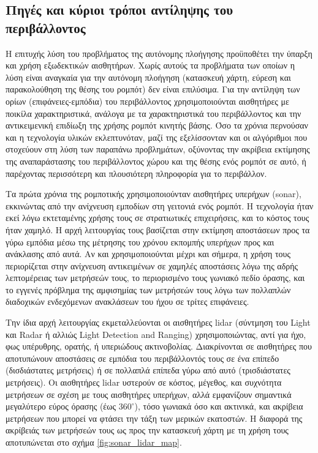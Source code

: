 \subsection{Πηγές και κύριοι τρόποι αντίληψης του περιβάλλοντος}
\label{subsec:01_01_01_2}

Η επιτυχής λύση του προβλήματος της αυτόνομης πλοήγησης προϋποθέτει την ύπαρξη
και χρήση εξωδεκτικών αισθητήρων. Χωρίς αυτούς τα προβλήματα των οποίων η λύση
είναι αναγκαία για την αυτόνομη πλοήγηση (κατασκευή χάρτη, εύρεση και
παρακολούθηση της θέσης του ρομπότ) δεν είναι επιλύσιμα. Για την αντίληψη των
ορίων (επιφάνειες-εμπόδια) του περιβάλλοντος χρησιμοποιούνται αισθητήρες με
ποικίλα χαρακτηριστικά, ανάλογα με τα χαρακτηριστικά του περιβάλλοντος και
την αντικειμενική επιδίωξη της χρήσης ρομπότ κινητής βάσης. Όσο τα χρόνια
περνούσαν και η τεχνολογία υλικών εκλεπτυνόταν, μαζί της εξελίσσονταν και
οι αλγόριθμοι που στοχεύουν στη λύση των παραπάνω προβλημάτων, οξύνοντας την
ακρίβεια εκτίμησης της αναπαράστασης του περιβάλλοντος χώρου και της θέσης ενός
ρομπότ σε αυτό, ή παρέχοντας περισσότερη και πλουσιότερη πληροφορία για το
περιβάλλον.

Τα πρώτα χρόνια της ρομποτικής χρησιμοποιούνταν αισθητήρες υπερήχων (sonar),
εκκινώντας από την ανίχνευση εμποδίων στη γειτονιά ενός ρομπότ. Η τεχνολογία
ήταν εκεί λόγω εκτεταμένης χρήσης τους σε στρατιωτικές επιχειρήσεις, και το
κόστος τους ήταν χαμηλό. Η αρχή λειτουργίας τους βασίζεται στην εκτίμηση
αποστάσεων προς τα γύρω εμπόδια μέσω της μέτρησης του χρόνου εκπομπής υπερήχων
προς και ανάκλασης από αυτά. Αν και χρησιμοποιούνται μέχρι και σήμερα, η χρήση
τους περιορίζεται στην ανίχνευση αντικειμένων σε χαμηλές αποστάσεις λόγω της
αδρής λεπτομέρειας των μετρήσεών τους, το περιορισμένο τους γωνιακό πεδίο
όρασης, και το εγγενές πρόβλημα της αμφισημίας των μετρήσεών τους λόγω των
πολλαπλών διαδοχικών ενδεχόμενων ανακλάσεων του ήχου σε τρίτες επιφάνειες.

Την ίδια αρχή λειτουργίας εκμεταλλεύονται οι αισθητήρες lidar (σύντμηση του
Light και Radar ή αλλιώς Light Detection and Ranging) χρησιμοποιώντας, αντί για
ήχο, φως υπέρυθρης, ορατής, ή υπεριώδους ακτινοβολίας. Διακρίνονται σε
αισθητήρες που αποτυπώνουν αποστάσεις σε εμπόδια του περιβάλλοντός τους σε ένα
επίπεδο (δισδιάστατες μετρήσεις) ή σε πολλαπλά επίπεδα γύρω από αυτό
(τρισδιάστατες μετρήσεις). Οι αισθητήρες lidar υστερούν σε κόστος, μέγεθος, και
συχνότητα μετρήσεων σε σχέση με τους αισθητήρες υπερήχων, αλλά εμφανίζουν
σημαντικά μεγαλύτερο εύρος όρασης (έως $360^\circ$), τόσο γωνιακά όσο και
ακτινικά, και ακρίβεια μετρήσεων που μπορεί να φτάσει την τάξη των μερικών
εκατοστών. Η διαφορά της ακρίβειάς των μετρήσεών τους ως προς την κατασκευή
χάρτη με τη χρήση τους αποτυπώνεται στο σχήμα \ref{fig:sonar_lidar_map}.

